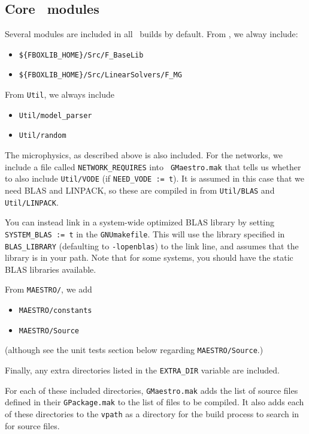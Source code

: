 \subsection{Core \maestro\ modules}

Several modules are included in all \maestro\ builds by default.
From \fboxlib, we alway include:
\begin{itemize}
\item {\tt \$\{FBOXLIB\_HOME\}/Src/F\_BaseLib}
\item {\tt \$\{FBOXLIB\_HOME\}/Src/LinearSolvers/F\_MG}
\end{itemize}

\noindent From {\tt Util}, we always include
\begin{itemize}
\item {\tt Util/model\_parser}
\item {\tt Util/random}
\end{itemize}

The microphysics, as described above is also included.  For the
networks, we include a file called {\tt NETWORK\_REQUIRES} into {\tt
  GMaestro.mak} that tells us whether to also include {\tt Util/VODE}
(if {\tt NEED\_VODE := t}).  It is assumed in this case that we need
BLAS and LINPACK, so these are compiled in from {\tt Util/BLAS}  and
{\tt Util/LINPACK}.  

You can instead link in a system-wide optimized BLAS library by setting
{\tt SYSTEM\_BLAS := t} in the {\tt GNUmakefile}.  This will
use the library specified in  {\tt BLAS\_LIBRARY}
(defaulting to {\tt -lopenblas})
to the link line, and assumes that the library is in your path.  Note
that for some systems, you should have the static BLAS libraries 
available. 


From {\tt MAESTRO/}, we add
\begin{itemize}
\item {\tt MAESTRO/constants}
\item {\tt MAESTRO/Source}
\end{itemize}
(although see the unit tests section below regarding {\tt MAESTRO/Source}.)

\noindent Finally, any extra directories listed in the {\tt EXTRA\_DIR}
variable are included.

For each of these included directories, {\tt GMaestro.mak} adds the
list of source files defined in their {\tt GPackage.mak} to the list
of files to be compiled.  It also adds each of these directories to
the {\tt vpath} as a directory for the build process to search in for
source files.


